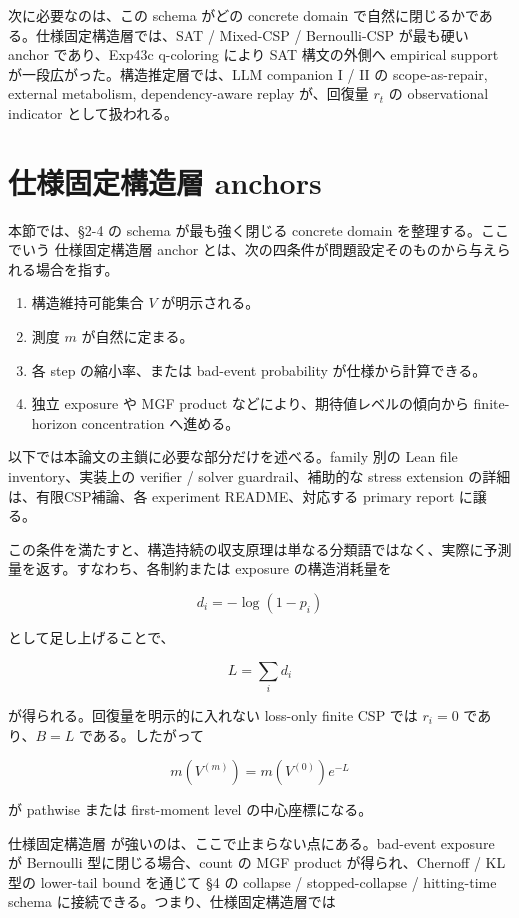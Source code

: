 \documentclass[12pt,a4paper]{article}
\begin{document}
次に必要なのは、この schema がどの concrete domain で自然に閉じるかである。仕様固定構造層では、SAT / Mixed-CSP / Bernoulli-CSP が最も硬い anchor であり、Exp43c q-coloring により SAT 構文の外側へ empirical support が一段広がった。構造推定層では、LLM companion I / II の scope-as-repair, external metabolism, dependency-aware replay が、回復量 \(r_{t}\) の observational indicator として扱われる。

\section{仕様固定構造層 anchors}\label{ux4ed5ux69d8ux56faux5b9aux69cbux9020ux5c64-anchors}

本節では、§2-4 の schema が最も強く閉じる concrete domain を整理する。ここでいう 仕様固定構造層 anchor とは、次の四条件が問題設定そのものから与えられる場合を指す。

\begin{enumerate}
\def\labelenumi{\arabic{enumi}.}
\tightlist
\item
  構造維持可能集合 \(V\) が明示される。
\item
  測度 \(m\) が自然に定まる。
\item
  各 step の縮小率、または bad-event probability が仕様から計算できる。
\item
  独立 exposure や MGF product などにより、期待値レベルの傾向から finite-horizon concentration へ進める。
\end{enumerate}

以下では本論文の主鎖に必要な部分だけを述べる。family 別の Lean file inventory、実装上の verifier / solver guardrail、補助的な stress extension の詳細は、有限CSP補論、各 experiment README、対応する primary report に譲る。

この条件を満たすと、構造持続の収支原理は単なる分類語ではなく、実際に予測量を返す。すなわち、各制約または exposure の構造消耗量を

\[
d_{i} = -\log(1-p_{i})
\]

として足し上げることで、

\[
L = \sum_{i} d_{i}
\]

が得られる。回復量を明示的に入れない loss-only finite CSP では \(r_{i}=0\) であり、\(B=L\) である。したがって

\[
m(V^{(m)}) = m(V^{(0)})e^{-L}
\]

が pathwise または first-moment level の中心座標になる。

仕様固定構造層 が強いのは、ここで止まらない点にある。bad-event exposure が Bernoulli 型に閉じる場合、count の MGF product が得られ、Chernoff / KL 型の lower-tail bound を通じて §4 の collapse / stopped-collapse / hitting-time schema に接続できる。つまり、仕様固定構造層では
\end{document}
